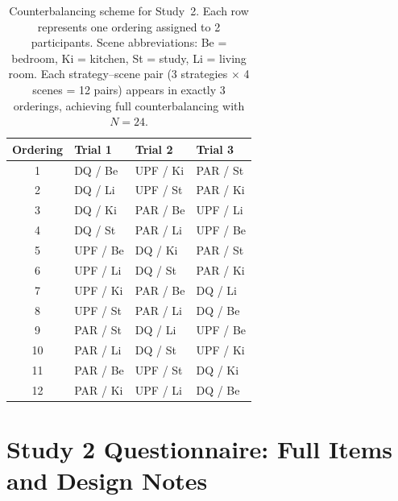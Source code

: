 \documentclass[manuscript,review,anonymous]{acmart}
\begin{document}
\begin{table}[h]
\centering
\caption{Counterbalancing scheme for Study~2. Each row represents one ordering assigned to 2 participants. Scene abbreviations: Be = bedroom, Ki = kitchen, St = study, Li = living room. Each strategy--scene pair (3 strategies $\times$ 4 scenes = 12 pairs) appears in exactly 3 orderings, achieving full counterbalancing with $N = 24$.}
\label{tab:latin-square}
\begin{tabularx}{\linewidth}{@{} c >{\centering\arraybackslash}X >{\centering\arraybackslash}X >{\centering\arraybackslash}X @{}}
\toprule
\textbf{Ordering} & \textbf{Trial 1} & \textbf{Trial 2} & \textbf{Trial 3} \\
\midrule
1  & DQ / Be  & UPF / Ki & PAR / St \\
2  & DQ / Li  & UPF / St & PAR / Ki \\
3  & DQ / Ki  & PAR / Be & UPF / Li \\
4  & DQ / St  & PAR / Li & UPF / Be \\
5  & UPF / Be & DQ / Ki  & PAR / St \\
6  & UPF / Li & DQ / St  & PAR / Ki \\
7  & UPF / Ki & PAR / Be & DQ / Li  \\
8  & UPF / St & PAR / Li & DQ / Be  \\
9  & PAR / St & DQ / Li  & UPF / Be \\
10 & PAR / Li & DQ / St  & UPF / Ki \\
11 & PAR / Be & UPF / St & DQ / Ki  \\
12 & PAR / Ki & UPF / Li & DQ / Be  \\
\bottomrule
\end{tabularx}
\end{table}


\section{Study 2 Questionnaire: Full Items and Design Notes}
\label{app:study2-questionnaire}
\end{document}
